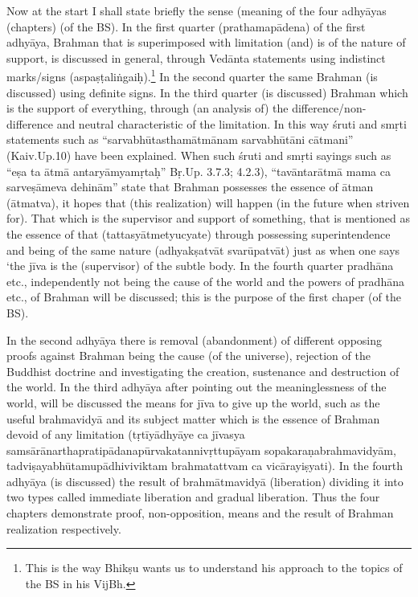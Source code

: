 

Now at the start I shall state briefly the sense (meaning of the four adhyāyas (chapters) (of the BS). In the first quarter (prathamapādena) of the first adhyāya, Brahman that is superimposed with limitation (and) is of the nature of support, is discussed in general, through Vedānta statements using indistinct marks/signs (aspaṣṭaliṅgaiḥ).\footnote{This is the way Bhikṣu wants us to understand his approach to the topics of the BS in his VijBh.} In the second  quarter the same Brahman (is discussed) using definite signs. In the third quarter (is discussed) Brahman which is the support of everything, through (an analysis of) the difference/non-\-difference and neutral characteristic of the limitation.  In this way śruti and smṛti statements such as “sarvabhūtasthamātmānam sarvabhūtāni cātmani” (Kaiv.Up.10) have been explained. When such śruti and smṛti sayings such as “eṣa ta ātmā antaryāmyamṛtaḥ” Bṛ.Up. 3.7.3; 4.2.3), “tavāntarātmā mama ca sarveṣāmeva dehinām” state that Brahman possesses the essence of ātman (ātmatva), it hopes that (this realization) will happen (in the future when striven for). That which is the supervisor and support of something, that is mentioned as the essence of that (tattasyātmetyucyate) through possessing superintendence and being of the same nature (adhyakṣatvāt svarūpatvāt) just as when one says ‘the jīva is the (supervisor) of the subtle body. In the fourth quarter pradhāna etc., independently not being the cause of the world and the powers of pradhāna etc., of Brahman will be discussed; this is the purpose of the first chaper (of the BS). 

In the second adhyāya there is removal (abandonment) of different opposing proofs against Brahman being the cause (of the universe), rejection of the Buddhist doctrine and investigating the creation, sustenance and destruction of the world. In the third adhyāya after pointing out the meaninglessness of the world, will be discussed the means for jīva to give up the world, such as the useful brahmavidyā and its subject matter which is the essence of Brahman devoid of any limitation (tṛtīyādhyāye ca jīvasya samsārānarthapratipādanapūrvakatannivṛttupāyam sopakaraṇabrahmavidyām, tadviṣayabhūtamupādhivi\-viktam brahmatattvam ca vicārayiṣyati). In the fourth adhyāya (is discussed) the result of brahmātmavidyā (liberation) dividing it into two types called immediate liberation and gradual liberation. Thus the four chapters demonstrate proof, non-opposition, means and the result of Brahman realization respectively.

